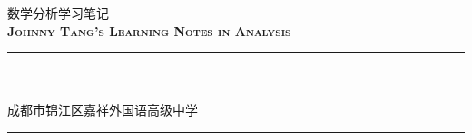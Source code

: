 
\begin{titlepage}
    \colorbox{black!5}{
        \parbox[t]{0.975\textwidth}{%
            \parbox[t]{0.95\textwidth}{%
                \raggedleft\vspace{0.75cm}\Huge\scshape
                数学分析学习笔记 \\[7.5pt]
                \large\bf Johnny Tang's Learning Notes in Analysis
                \vspace{0.75cm}
            }
        }
    }

    \vfill

    \parbox[t]{0.95\textwidth}{%
        \hfill\rule{0.15\linewidth}{0.5pt}\\[7.5pt]
        \raggedleft
        \textcopyright{}\\[4pt]
        
        \normalsize\textsuperscript{\textdagger} 成都市锦江区嘉祥外国语高级中学\\

        \hfill\rule{0.15\linewidth}{0.5pt}
    }
\end{titlepage}
